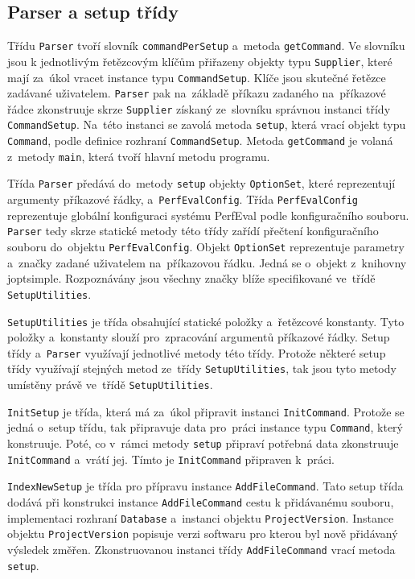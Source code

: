\subsection{Parser a setup třídy}

Třídu \lstinline{Parser} tvoří slovník \lstinline{commandPerSetup} a~metoda \lstinline{getCommand}.
Ve slovníku jsou k jednotlivým řetězcovým klíčům přiřazeny objekty typu
\lstinline{Supplier}, které mají za~úkol vracet instance typu \lstinline{CommandSetup}.
Klíče jsou skutečné řetězce zadávané uživatelem. \lstinline{Parser} pak na~základě příkazu
zadaného na~příkazové řádce zkonstruuje skrze \lstinline{Supplier} získaný ze~slovníku správnou
instanci třídy \lstinline{CommandSetup}. Na~této instanci se zavolá metoda \lstinline{setup}, která vrací
objekt typu \lstinline{Command}, podle definice rozhraní \lstinline{CommandSetup}. Metoda \lstinline{getCommand} je volaná
z~metody \lstinline{main}, která tvoří hlavní metodu programu.

Třída \lstinline{Parser} předává do~metody \lstinline{setup} objekty \lstinline{OptionSet}, které reprezentují argumenty příkazové řádky,
a~\lstinline{PerfEvalConfig}. Třída \lstinline{PerfEvalConfig}
reprezentuje globální konfiguraci systému PerfEval podle konfiguračního souboru.
\lstinline{Parser} tedy skrze statické metody této třídy zařídí přečtení konfiguračního souboru
do~objektu \lstinline{PerfEvalConfig}. Objekt \lstinline{OptionSet} reprezentuje parametry a~značky zadané
uživatelem na~příkazovou řádku. Jedná se o~objekt z~knihovny joptsimple. Rozpoznávány jsou
všechny značky blíže specifikované ve~třídě \lstinline{SetupUtilities}.

\lstinline{SetupUtilities} je třída obsahující statické položky a~řetězcové konstanty.
Tyto položky a~konstanty slouží pro~zpracování argumentů příkazové řádky.
Setup třídy a~\lstinline{Parser} využívají jednotlivé metody této třídy.
Protože některé setup třídy využívají stejných metod ze~třídy \lstinline{SetupUtilities}, tak jsou tyto metody umístěny
právě ve~třídě \lstinline{SetupUtilities}.

\lstinline{InitSetup} je třída, která má za~úkol připravit instanci \lstinline{InitCommand}. Protože se jedná
o~setup třídu, tak připravuje data pro~práci instance typu \lstinline{Command}, který konstruuje. Poté, co v~rámci
metody \lstinline{setup} připraví potřebná data zkonstruuje \lstinline{InitCommand} a~vrátí jej.
Tímto je \lstinline{InitCommand} připraven k~práci.

\lstinline{IndexNewSetup} je třída pro přípravu instance \lstinline{AddFileCommand}. Tato setup třída dodává
při konstrukci instance \lstinline{AddFileCommand} cestu k přidávanému souboru, implementaci rozhraní \lstinline{Database}
a~instanci objektu \lstinline{ProjectVersion}. Instance objektu \lstinline{ProjectVersion} popisuje verzi softwaru pro kterou
byl nově přidávaný výsledek změřen. Zkonstruovanou instanci třídy \lstinline{AddFileCommand} vrací metoda \lstinline{setup}.


